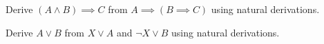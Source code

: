 \documentclass[addpoints]{exam}
\begin{document}
  \pagestyle{headandfoot}
  \runningheadrule

  \firstpagefooter{}{}{}
  \runningfooter{}{}{}
  \begin{flushright}

    \vspace{0.2in}
  \end{flushright}

  \begin{questions}
    \question[10]
      Derive $(A \land B) \implies C$ from $A \implies (B \implies C)$ using natural
			derivations.

      \begin{solution}[\stretch{1}]
      \end{solution}
      \newpage
    \question[10]
      Derive $A \lor B$ from $X \lor A$ and $\lnot X \lor B$ using natural
			derivations.

      \begin{solution}[\stretch{1}]
      \end{solution}
      \newpage
  \end{questions}
\end{document}
